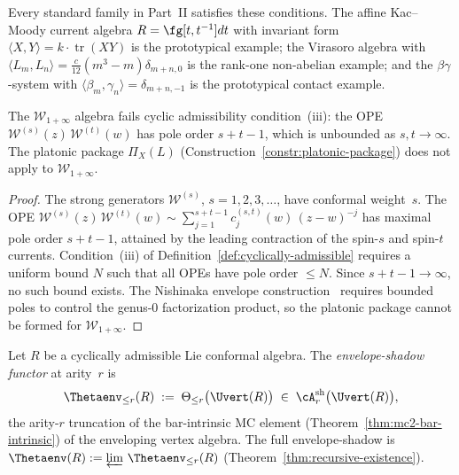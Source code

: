 Every standard family in Part~II satisfies these conditions.
The affine Kac--Moody current algebra $R = \fg[t,t^{-1}]dt$
with invariant form $\langle X, Y \rangle = k \cdot
\operatorname{tr}(XY)$ is the prototypical example; the
Virasoro algebra with $\langle L_m, L_n \rangle =
\frac{c}{12}(m^3 - m)\delta_{m+n,0}$ is the rank-one
non-abelian example; and the $\beta\gamma$-system with
$\langle \beta_m, \gamma_n \rangle = \delta_{m+n,-1}$ is the
prototypical contact example.

\begin{proposition}
\label{prop:winfinity-not-cyclically-admissible}
\ClaimStatusProvedHere
{}
The $\mathcal{W}_{1+\infty}$ algebra fails cyclic admissibility
condition~\textup{(iii)}: the OPE
$\mathcal{W}^{(s)}(z)\,\mathcal{W}^{(t)}(w)$ has pole order
$s + t - 1$, which is unbounded as $s, t \to \infty$.
The platonic package $\Pi_X(L)$
\textup{(}Construction~\textup{\ref{constr:platonic-package}}\textup{)}
does not apply to $\mathcal{W}_{1+\infty}$.
\end{proposition}

\begin{proof}
The strong generators $\mathcal{W}^{(s)}$, $s = 1, 2, 3, \ldots$,
have conformal weight~$s$.  The OPE
$\mathcal{W}^{(s)}(z)\,\mathcal{W}^{(t)}(w) \sim
\sum_{j=1}^{s+t-1} c_j^{(s,t)}(w)\,(z - w)^{-j}$
has maximal pole order $s + t - 1$, attained by the leading
contraction of the spin-$s$ and spin-$t$ currents.
Condition~(iii) of Definition~\ref{def:cyclically-admissible}
requires a uniform bound $N$ such that all OPEs have pole order
$\leq N$.  Since $s + t - 1 \to \infty$, no such bound exists.
The Nishinaka envelope construction~\cite{Nish26} requires bounded
poles to control the genus-$0$ factorization product, so the
platonic package cannot be formed for $\mathcal{W}_{1+\infty}$.
\end{proof}

\begin{definition}
\label{def:envelope-shadow-functor}
\ClaimStatusProvedHere
{}
Let $R$ be a cyclically admissible Lie conformal algebra.
The \emph{envelope-shadow functor} at arity~$r$ is
\begin{equation}\label{eq:envelope-shadow-functor}
\Thetaenv_{\leq r}(R)
\;:=\;
\Theta_{\leq r}\bigl(\Uvert(R)\bigr)
\;\in\;
\cA^{\mathrm{sh}}_r\bigl(\Uvert(R)\bigr),
\end{equation}
the arity-$r$ truncation of the bar-intrinsic MC element
(Theorem~\textup{\ref{thm:mc2-bar-intrinsic}}) of the
enveloping vertex algebra.
The full envelope-shadow is
$\Thetaenv(R) := \varprojlim\, \Thetaenv_{\leq r}(R)$
(Theorem~\textup{\ref{thm:recursive-existence}}).
\end{definition}

